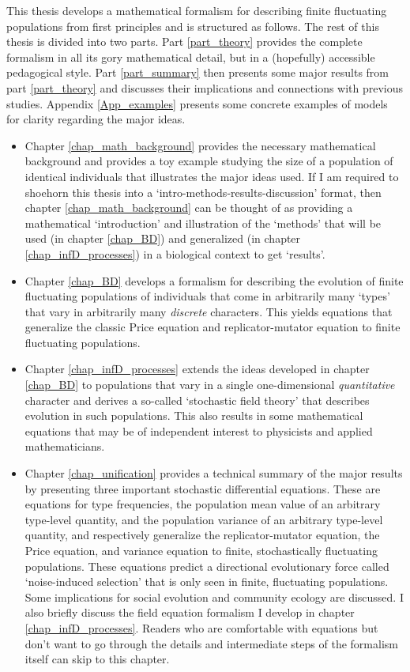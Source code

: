 This thesis develops a mathematical formalism for describing finite fluctuating populations from first principles and is structured as follows. The rest of this thesis is divided into two parts. Part \ref{part_theory} provides the complete formalism in all its gory mathematical detail, but in a (hopefully) accessible pedagogical style. Part \ref{part_summary} then presents some major results from part \ref{part_theory} and discusses their implications and connections with previous studies. Appendix \ref{App_examples} presents some concrete examples of models for clarity regarding the major ideas.

\begin{itemize}
		\item Chapter \ref{chap_math_background} provides the necessary mathematical background and provides a toy example studying the size of a population of identical individuals that illustrates the major ideas used. If I am required to shoehorn this thesis into a `intro-methods-results-discussion' format, then chapter \ref{chap_math_background} can be thought of as providing a mathematical `introduction' and illustration of the `methods' that will be used (in chapter \ref{chap_BD}) and generalized (in chapter \ref{chap_infD_processes}) in a biological context to get `results'.
		\item Chapter \ref{chap_BD} develops a formalism for describing the evolution of finite fluctuating populations of individuals that come in arbitrarily many `types' that vary in arbitrarily many \emph{discrete} characters. This yields equations that generalize the classic Price equation and replicator-mutator equation to finite fluctuating populations.
		\item Chapter \ref{chap_infD_processes} extends the ideas developed in chapter \ref{chap_BD} to populations that vary in a single one-dimensional \emph{quantitative} character and derives a so-called `stochastic field theory' that describes evolution in such populations. This also results in some mathematical equations that may be of independent interest to physicists and applied mathematicians.
		\item Chapter \ref{chap_unification} provides a technical summary of the major results by presenting three important stochastic differential equations. These are equations for type frequencies, the population mean value of an arbitrary type-level quantity, and the population variance of an arbitrary type-level quantity, and respectively generalize the replicator-mutator equation, the Price equation, and  variance equation to finite, stochastically fluctuating populations. These equations predict a directional evolutionary force called `noise-induced selection' that is only seen in finite, fluctuating populations. Some implications for social evolution and community ecology are discussed. I also briefly discuss the field equation formalism I develop in chapter \ref{chap_infD_processes}. Readers who are comfortable with equations but don't want to go through the details and intermediate steps of the formalism itself can skip to this chapter.

\end{itemize}
